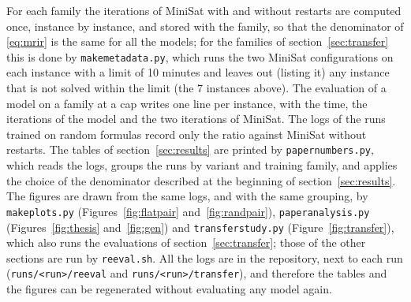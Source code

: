 \documentclass[11pt,a4paper]{article}
\newcommand{\code}[1]{\texttt{\def\_{\textunderscore\allowbreak}#1}}
\begin{document}
\smallskip
\noindent
For each family the iterations of MiniSat with and without restarts are
computed once, instance by instance, and stored with the family, so that the
denominator of \eqref{eq:mrir} is the same for all the models; for the families
of section~\ref{sec:transfer} this is done by \code{make\_metadata.py}, which
runs the two MiniSat configurations on each instance with a limit of 10 minutes
and leaves out (listing it) any instance that is not solved within the limit
(the 7 instances above). The evaluation
of a model on a family at a cap writes one line per instance, with the time, the
iterations of the model and the two iterations of MiniSat. The logs of the
runs trained on random formulas record only the ratio against MiniSat without
restarts. The tables of section~\ref{sec:results} are printed
by \code{paper\_numbers.py}, which reads the logs, groups the runs by variant
and training family, and applies the choice of the denominator described at the
beginning of section~\ref{sec:results}. The figures are drawn from the same
logs, and with the same grouping, by \code{make\_plots.py}
(Figures~\ref{fig:flatpair} and~\ref{fig:randpair}), \code{paper\_analysis.py}
(Figures~\ref{fig:thesis} and~\ref{fig:gen}) and \code{transfer\_study.py}
(Figure~\ref{fig:transfer}), which also runs the evaluations of
section~\ref{sec:transfer}; those of the other sections are run by
\code{reeval.sh}. All the logs are in the repository, next to each run
(\code{runs/<run>/reeval} and \code{runs/<run>/transfer}), and therefore the
tables and the figures can be regenerated without evaluating any model again.
\end{document}
